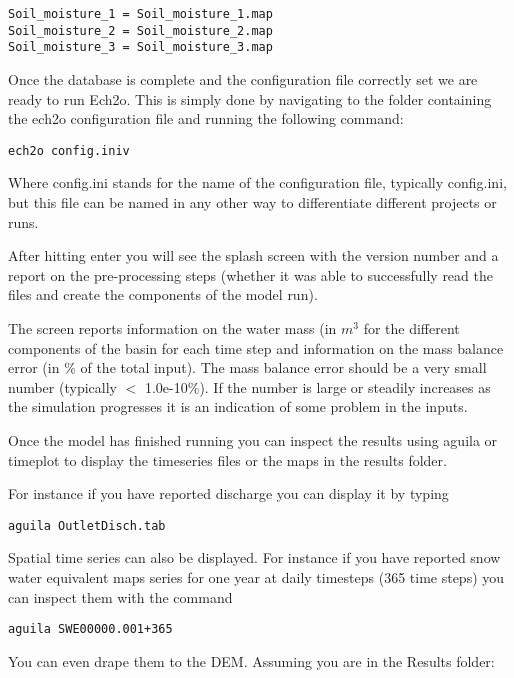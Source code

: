 \begin{verbatim}
Soil_moisture_1 = Soil_moisture_1.map 
Soil_moisture_2 = Soil_moisture_2.map 
Soil_moisture_3 = Soil_moisture_3.map 
\end{verbatim} 
 
Once the database is complete and the configuration file correctly set we are ready to run Ech2o. This is simply done by navigating to the folder containing the ech2o configuration file and running the following command: 

\begin{verbatim}
ech2o config.iniv
\end{verbatim} 

Where \textsf{config.ini} stands for the name of the configuration file, typically \textsf{config.ini}, but this file can be named in any other way to differentiate different projects or runs. 

After hitting enter you will see the splash screen with the version number and a report on the pre-processing steps (whether it was able to successfully read the files and create the components of the model run). 

The screen reports information on the water mass (in $ m^{3} $ for the different components of the basin for each time step and information on the mass balance error (in \% of the total input). The mass balance error should be a very small number (typically $<$ 1.0e-10\%). If the number is large or steadily increases as the simulation progresses it is an indication of some problem in the inputs. 

Once the model has finished running you can inspect the results using \textsf{aguila} or \textsf{timeplot} to display the timeseries files or the maps in the results folder. 

For instance if you have reported discharge you can display it by typing

\begin{verbatim}
aguila OutletDisch.tab
\end{verbatim}

Spatial time series can also be displayed. For instance if you have reported snow water equivalent maps series for one year at daily timesteps (365 time steps) you can inspect them with the command

\begin{verbatim}
aguila SWE00000.001+365
\end{verbatim}

You can even drape them to the DEM. Assuming you are in the \textsf{Results} folder:


